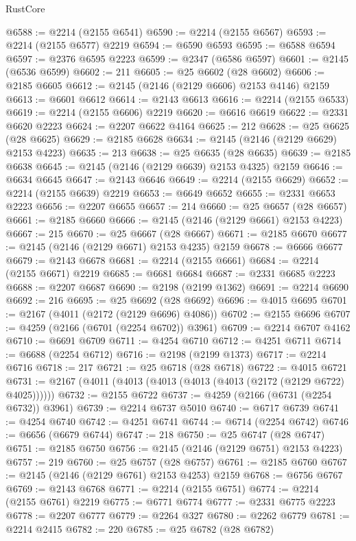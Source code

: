\begin{lexlean}{RustCore}
\begin{coremodule}
@6588 := @2214 (@2155 @6541)
@6590 := @2214 (@2155 @6567)
@6593 := @2214 (@2155 @6577) @2219
@6594 := @6590 @6593
@6595 := @6588 @6594
@6597 := @2376 @6595 @2223
@6599 := @2347 (@6586 @6597)
@6601 := @2145 (@6536 @6599)
@6602 := 211
@6605 := @25 @6602 (@28 @6602)
@6606 := @2185 @6605
@6612 := @2145 (@2146 (@2129 @6606) @2153 @4146) @2159
@6613 := @6601 @6612
@6614 := @2143 @6613
@6616 := @2214 (@2155 @6533)
@6619 := @2214 (@2155 @6606) @2219
@6620 := @6616 @6619
@6622 := @2331 @6620 @2223
@6624 := @2207 @6622 @4164
@6625 := 212
@6628 := @25 @6625 (@28 @6625)
@6629 := @2185 @6628
@6634 := @2145 (@2146 (@2129 @6629) @2153 @4223)
@6635 := 213
@6638 := @25 @6635 (@28 @6635)
@6639 := @2185 @6638
@6645 := @2145 (@2146 (@2129 @6639) @2153 @4325) @2159
@6646 := @6634 @6645
@6647 := @2143 @6646
@6649 := @2214 (@2155 @6629)
@6652 := @2214 (@2155 @6639) @2219
@6653 := @6649 @6652
@6655 := @2331 @6653 @2223
@6656 := @2207 @6655
@6657 := 214
@6660 := @25 @6657 (@28 @6657)
@6661 := @2185 @6660
@6666 := @2145 (@2146 (@2129 @6661) @2153 @4223)
@6667 := 215
@6670 := @25 @6667 (@28 @6667)
@6671 := @2185 @6670
@6677 := @2145 (@2146 (@2129 @6671) @2153 @4235) @2159
@6678 := @6666 @6677
@6679 := @2143 @6678
@6681 := @2214 (@2155 @6661)
@6684 := @2214 (@2155 @6671) @2219
@6685 := @6681 @6684
@6687 := @2331 @6685 @2223
@6688 := @2207 @6687
@6690 := @2198 (@2199 @1362)
@6691 := @2214 @6690
@6692 := 216
@6695 := @25 @6692 (@28 @6692)
@6696 := @4015 @6695
@6701 := @2167 (@4011 (@2172 (@2129 @6696) @4086))
@6702 := @2155 @6696
@6707 := @4259 (@2166 (@6701 (@2254 @6702)) @3961)
@6709 := @2214 @6707 @4162
@6710 := @6691 @6709
@6711 := @4254 @6710
@6712 := @4251 @6711
@6714 := @6688 (@2254 @6712)
@6716 := @2198 (@2199 @1373)
@6717 := @2214 @6716
@6718 := 217
@6721 := @25 @6718 (@28 @6718)
@6722 := @4015 @6721
@6731 := @2167 (@4011 (@4013 (@4013 (@4013 (@4013 (@2172 (@2129 @6722) @4025))))))
@6732 := @2155 @6722
@6737 := @4259 (@2166 (@6731 (@2254 @6732)) @3961)
@6739 := @2214 @6737 @5010
@6740 := @6717 @6739
@6741 := @4254 @6740
@6742 := @4251 @6741
@6744 := @6714 (@2254 @6742)
@6746 := @6656 (@6679 @6744)
@6747 := 218
@6750 := @25 @6747 (@28 @6747)
@6751 := @2185 @6750
@6756 := @2145 (@2146 (@2129 @6751) @2153 @4223)
@6757 := 219
@6760 := @25 @6757 (@28 @6757)
@6761 := @2185 @6760
@6767 := @2145 (@2146 (@2129 @6761) @2153 @4253) @2159
@6768 := @6756 @6767
@6769 := @2143 @6768
@6771 := @2214 (@2155 @6751)
@6774 := @2214 (@2155 @6761) @2219
@6775 := @6771 @6774
@6777 := @2331 @6775 @2223
@6778 := @2207 @6777
@6779 := @2264 @327
@6780 := @2262 @6779
@6781 := @2214 @2415
@6782 := 220
@6785 := @25 @6782 (@28 @6782)

\end{coremodule}
\end{lexlean}
